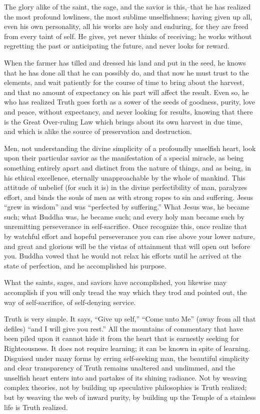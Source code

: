\documentclass[12pt,oneside]{scrbook}
\begin{document}
  The glory alike of the saint, the sage, and the savior is this,--that he
  has realized the most profound lowliness, the most sublime
  unselfishness; having given up all, even his own personality, all his
  works are holy and enduring, for they are freed from every taint of
  self. He gives, yet never thinks of receiving; he works without
  regretting the past or anticipating the future, and never looks for
  reward.
  
  When the farmer has tilled and dressed his land and put in the seed, he
  knows that he has done all that he can possibly do, and that now he must
  trust to the elements, and wait patiently for the course of time to
  bring about the harvest, and that no amount of expectancy on his part
  will affect the result. Even so, he who has realized Truth goes forth as
  a sower of the seeds of goodness, purity, love and peace, without
  expectancy, and never looking for results, knowing that there is the
  Great Over-ruling Law which brings about its own harvest in due time,
  and which is alike the source of preservation and destruction.
  
  Men, not understanding the divine simplicity of a profoundly unselfish
  heart, look upon their particular savior as the manifestation of a
  special miracle, as being something entirely apart and distinct from the
  nature of things, and as being, in his ethical excellence, eternally
  unapproachable by the whole of mankind. This attitude of unbelief (for
  such it is) in the divine perfectibility of man, paralyzes effort, and
  binds the souls of men as with strong ropes to sin and suffering. Jesus
  ``grew in wisdom'' and was ``perfected by suffering.'' What Jesus was,
  he became such; what Buddha was, he became such; and every holy man
  became such by unremitting perseverance in self-sacrifice. Once
  recognize this, once realize that by watchful effort and hopeful
  perseverance you can rise above your lower nature, and great and
  glorious will be the vistas of attainment that will open out before you.
  Buddha vowed that he would not relax his efforts until he arrived at the
  state of perfection, and he accomplished his purpose.
  
  What the saints, sages, and saviors have accomplished, you likewise may
  accomplish if you will only tread the way which they trod and pointed
  out, the way of self-sacrifice, of self-denying service.
  
  Truth is very simple. It says, ``Give up self,'' ``Come unto Me'' (away
  from all that defiles) ``and I will give you rest.'' All the mountains
  of commentary that have been piled upon it cannot hide it from the heart
  that is earnestly seeking for Righteousness. It does not require
  learning; it can be known in spite of learning. Disguised under many
  forms by erring self-seeking man, the beautiful simplicity and clear
  transparency of Truth remains unaltered and undimmed, and the unselfish
  heart enters into and partakes of its shining radiance. Not by weaving
  complex theories, not by building up speculative philosophies is Truth
  realized; but by weaving the web of inward purity, by building up the
  Temple of a stainless life is Truth realized.
  
\end{document}
